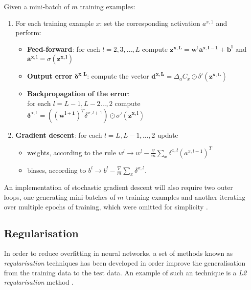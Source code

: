 Given a mini-batch of $m$ training examples:

\begin{enumerate}
\item For each training example $x$: set the corresponding activation $a^{x, 1}$ and perform:        \begin{itemize}
  \item \textbf{Feed-forward}: for each $l = 2, 3, \dots, L$ compute $\boldsymbol{z^{x, L}} = \boldsymbol{w^l}\boldsymbol{a^{x,l-1}} + \boldsymbol{b^l}$ and $\boldsymbol{a^{x,l}} = \sigma(\boldsymbol{z^{x,l}})$
  \item \textbf{Output error} $\boldsymbol{\delta^{x, L}}$: compute the vector $\boldsymbol{d^{x, L}} = \Delta_a C_x  \odot \delta'(\boldsymbol{z^{x, L}})$
  \item \textbf{Backpropagation of the error}: \\ for each $l = L - 1, L - 2 \dots, 2$ compute $\boldsymbol{\delta^{x, l}} = ((\boldsymbol{w^{l+1}})^T \delta^{x, l+1}) \odot \sigma'(\boldsymbol{z^{x, l}})$
  \end{itemize}
\item \textbf{Gradient descent}: for each $l = L, L - 1, \dots, 2$ update 
\begin{itemize}
    \item weights, according to the rule $w^l \rightarrow w^l - \frac{\eta}{m} \sum_x \delta^{x,l} (a^{x, l - 1})^T$
    \item biases, according to $b^l \rightarrow b^l - \frac{\nabla}{m} \sum_x \delta^{x, l}$.   
\end{itemize}
\end{enumerate}

An implementation of stochastic gradient descent will also require two outer loops, one generating mini-batches of $m$ training examples and another iterating over multiple epochs of training, which were omitted for simplicity \cite{backpropagation_nielsen}.

\subsection{Regularisation}

In order to reduce overfitting in neural networks, a set of methods known as \emph{regularisation} techniques has been developed in order improve the generalisation from the training data to the test data. An example of such an technique is a \emph{L2 regularisation} method \cite{backpropagation_nielsen}.

